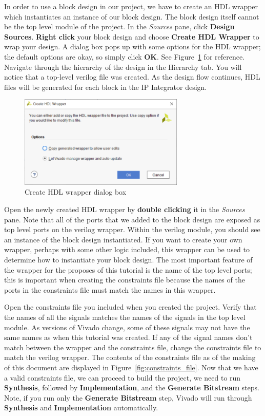 \documentclass[11pt]{article}
\begin{document}
In order to use a block design in our project, we have to create an HDL wrapper which instantiates an instance of our block design. The block design itself cannot be the top level module of the project. In the \textit{Sources} pane, click \textbf{Design Sources}. \textbf{Right click} your block design and choose \textbf{Create HDL Wrapper} to wrap your design. A dialog box pops up with some options for the HDL wrapper; the default options are okay, so simply click \textbf{OK}. See Figure~\ref{fig:create_wrapper} for reference. Navigate through the hierarchy of the design in the Hierarchy tab. You will notice that a top-level verilog file was created. As the design flow continues, HDL files will be generated for each block in the IP Integrator design.

\begin{figure}[h]
    \centering
    \includegraphics[width=0.7\textwidth]{images/create_wrapper.png}
    \caption{Create HDL wrapper dialog box}
    \label{fig:create_wrapper}
\end{figure}

Open the newly created HDL wrapper by \textbf{double clicking} it in the \textit{Sources} pane. Note that all of the ports that we added to the block design are exposed as top level ports on the verilog wrapper. Within the verilog module, you should see an instance of the block design instantiated. If you want to create your own wrapper, perhaps with some other logic included, this wrapper can be used to determine how to instantiate your block design. The most important feature of the wrapper for the proposes of this tutorial is the name of the top level ports; this is important when creating the constraints file because the names of the ports in the constraints file must match the names in this wrapper.

Open the constraints file you included when you created the project. Verify that the names of all the signals matches the names of the signals in the top level module. As versions of Vivado change, some of these signals may not have the same names as when this tutorial was created. If any of the signal names don't match between the wrapper and the constraints file, change the constraints file to match the verilog wrapper. The contents of the constraints file as of the making of this document are displayed in Figure~\ref{fig:constraints_file}. Now that we have a valid constraints file, we can proceed to build the project, we need to run \textbf{Synthesis}, followed by \textbf{Implementation}, and the \textbf{Generate Bitstream} steps. Note, if you run only the \textbf{Generate Bitstream} step, Vivado will run through \textbf{Synthesis} and \textbf{Implementation} automatically.
\end{document}
